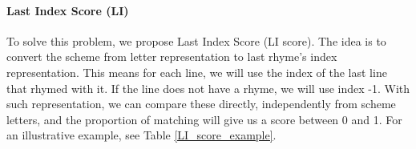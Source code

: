 \paragraph{Last Index Score (LI)} To solve this problem, we propose Last Index Score (LI score). The idea is to convert the scheme from letter representation to last rhyme's index representation. This means for each line, we will use the index of the last line that rhymed with it. If the line does not have a rhyme, we will use index -1. With such representation, we can compare these  directly, independently from scheme letters, and the proportion of matching  will give us a score between 0 and 1. For an illustrative example, see Table \ref{LI_score_example}.

